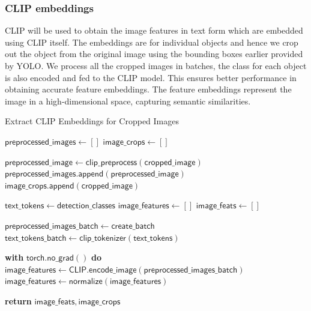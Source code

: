 \subsubsection{CLIP embeddings}
CLIP will be used to obtain the image features in text form which are embedded using CLIP itself. The embeddings are for individual objects and hence we crop 
out the object from the original image using the bounding boxes earlier provided by YOLO. We process all the cropped images in batches, the class for each object is 
also encoded and fed to the CLIP model. This ensures better performance in obtaining accurate feature embeddings. The feature embeddings represent the image in a 
high-dimensional space, capturing semantic similarities.
\begin{Algorithmus}
  \caption{Extract CLIP Embeddings for Cropped Images}
  \label{alg:clip_embeddings}
  \begin{algorithmic}
    
      \State $\mathsf{preprocessed\_images} \gets []$
      \State $\mathsf{image\_crops} \gets []$
      
        \State $\mathsf{preprocessed\_image} \gets \mathsf{clip\_preprocess(cropped\_image)}$
        \State $\mathsf{preprocessed\_images.append(preprocessed\_image)}$
        \State $\mathsf{image\_crops.append(cropped\_image)}$
      \EndFor
      
      \State $\mathsf{text\_tokens} \gets \mathsf{detection\_classes}$
      \State $\mathsf{image\_features} \gets []$
      \State $\mathsf{image\_feats} \gets []$
      
        \State $\mathsf{preprocessed\_images\_batch} \gets \mathsf{create\_batch}$
        \State $\mathsf{text\_tokens\_batch} \gets \mathsf{clip\_tokenizer(text\_tokens)}$
        
        \State \textbf{with} $\mathsf{torch.no\_grad()}$ \textbf{do} 
        \State \hspace{10pt} $\mathsf{image\_features} \gets \mathsf{CLIP.encode\_image(preprocessed\_images\_batch)}$
        \State \hspace{10pt} $\mathsf{image\_features} \gets \mathsf{normalize(image\_features)}$

      \EndIf
      
      \State \textbf{return} $\mathsf{image\_feats, image\_crops}$
      
    \EndProcedure
  \end{algorithmic}
\end{Algorithmus}


